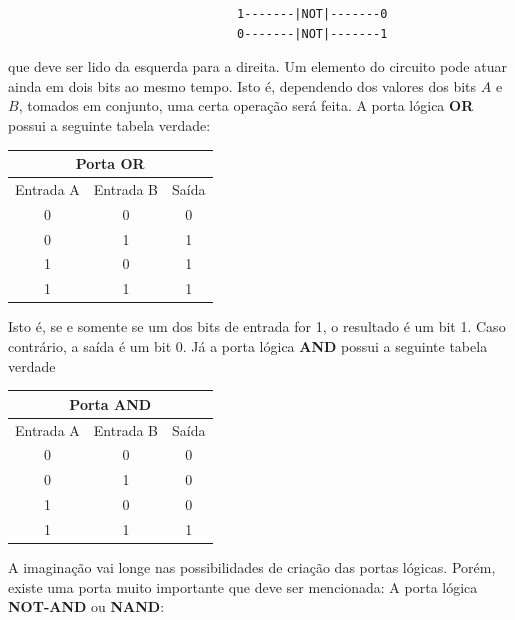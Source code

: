 \documentclass{article}
\begin{document}
\begin{center}
    \begin{verbatim}
                                1-------|NOT|-------0
                                0-------|NOT|-------1
    \end{verbatim}
\end{center}
que deve ser lido da esquerda para a direita. Um elemento do circuito pode atuar ainda em dois bits ao mesmo tempo. Isto é, dependendo dos valores dos bits $A$ e $B$, tomados em conjunto, uma certa operação será feita. A porta lógica \textbf{OR} possui a seguinte tabela verdade:

\begin{center}
\begin{tabular} { |c|c|c|  }
 \hline
 \multicolumn{3}{|c|}{Porta \textbf{OR}} \\
 \hline
 Entrada A & Entrada B & Saída\\
 \hline
 0 & 0 & 0\\
 0 & 1 & 1\\
 1 & 0 & 1\\
 1 & 1 & 1 \\
 \hline
\end{tabular}
\end{center}
Isto é, se e somente se um dos bits de entrada for 1, o resultado é um bit 1. Caso contrário, a saída é um bit 0. Já a porta lógica \textbf{AND} possui a seguinte tabela verdade

\begin{center}
\begin{tabular} { |c|c|c|  }
 \hline
 \multicolumn{3}{|c|}{Porta \textbf{AND}} \\
 \hline
 Entrada A & Entrada B & Saída\\
 \hline
 0 & 0 & 0\\
 0 & 1 & 0\\
 1 & 0 & 0\\
 1 & 1 & 1 \\
 \hline
\end{tabular}
\end{center}
 
A imaginação vai longe nas possibilidades de criação das portas lógicas. Porém, existe uma porta muito importante que deve ser mencionada: A porta lógica \textbf{NOT-AND} ou \textbf{NAND}:
\end{document}

